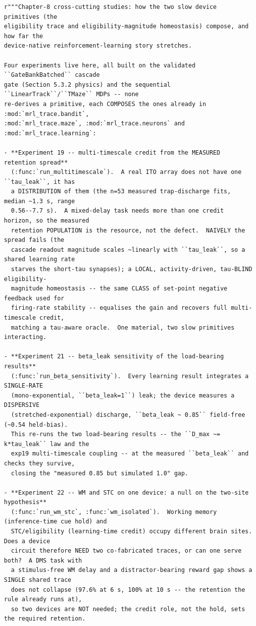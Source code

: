 \begin{lstlisting}[caption={mrl\_trace/extensions.py},label={lst:siox-src-extensions}]
r"""Chapter-8 cross-cutting studies: how the two slow device primitives (the
eligibility trace and eligibility-magnitude homeostasis) compose, and how far the
device-native reinforcement-learning story stretches.

Four experiments live here, all built on the validated ``GateBankBatched`` cascade
gate (Section 5.3.2 physics) and the sequential ``LinearTrack``/``TMaze`` MDPs -- none
re-derives a primitive, each COMPOSES the ones already in :mod:`mrl_trace.bandit`,
:mod:`mrl_trace.maze`, :mod:`mrl_trace.neurons` and
:mod:`mrl_trace.learning`:

- **Experiment 19 -- multi-timescale credit from the MEASURED retention spread**
  (:func:`run_multitimescale`).  A real ITO array does not have one ``tau_leak``, it has
  a DISTRIBUTION of them (the n=53 measured trap-discharge fits, median ~1.3 s, range
  0.56--7.7 s).  A mixed-delay task needs more than one credit horizon, so the measured
  retention POPULATION is the resource, not the defect.  NAIVELY the spread fails (the
  cascade readout magnitude scales ~linearly with ``tau_leak``, so a shared learning rate
  starves the short-tau synapses); a LOCAL, activity-driven, tau-BLIND eligibility-
  magnitude homeostasis -- the same CLASS of set-point negative feedback used for
  firing-rate stability -- equalises the gain and recovers full multi-timescale credit,
  matching a tau-aware oracle.  One material, two slow primitives interacting.

- **Experiment 21 -- beta_leak sensitivity of the load-bearing results**
  (:func:`run_beta_sensitivity`).  Every learning result integrates a SINGLE-RATE
  (mono-exponential, ``beta_leak=1``) leak; the device measures a DISPERSIVE
  (stretched-exponential) discharge, ``beta_leak ~ 0.85`` field-free (~0.54 held-bias).
  This re-runs the two load-bearing results -- the ``D_max ~= k*tau_leak`` law and the
  exp19 multi-timescale coupling -- at the measured ``beta_leak`` and checks they survive,
  closing the "measured 0.85 but simulated 1.0" gap.

- **Experiment 22 -- WM and STC on one device: a null on the two-site hypothesis**
  (:func:`run_wm_stc`, :func:`wm_isolated`).  Working memory (inference-time cue hold) and
  STC/eligibility (learning-time credit) occupy different brain sites.  Does a device
  circuit therefore NEED two co-fabricated traces, or can one serve both?  A DMS task with
  a stimulus-free WM delay and a distractor-bearing reward gap shows a SINGLE shared trace
  does not collapse (97.6% at 6 s, 100% at 10 s -- the retention the rule already runs at),
  so two devices are NOT needed; the credit role, not the hold, sets the required retention.


\end{lstlisting}
